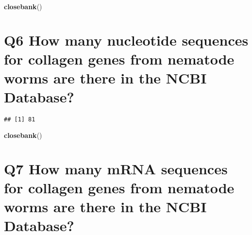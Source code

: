 \documentclass[]{article}
\newenvironment{Shaded}{\begin{snugshade}}{\end{snugshade}}
\newcommand{\KeywordTok}[1]{\textcolor[rgb]{0.13,0.29,0.53}{\textbf{#1}}}
\newcommand{\StringTok}[1]{\textcolor[rgb]{0.31,0.60,0.02}{#1}}
\newcommand{\OperatorTok}[1]{\textcolor[rgb]{0.81,0.36,0.00}{\textbf{#1}}}
\newcommand{\NormalTok}[1]{#1}
\begin{document}
\begin{Shaded}
\begin{Highlighting}[]
\KeywordTok{closebank}\NormalTok{()}
\end{Highlighting}
\end{Shaded}

\section{Q6 How many nucleotide sequences for collagen genes from
nematode worms are there in the NCBI
Database?}\label{q6-how-many-nucleotide-sequences-for-collagen-genes-from-nematode-worms-are-there-in-the-ncbi-database}

\begin{Shaded}
\end{Shaded}

\begin{verbatim}
## [1] 81
\end{verbatim}

\begin{Shaded}
\begin{Highlighting}[]
\KeywordTok{closebank}\NormalTok{()}
\end{Highlighting}
\end{Shaded}

\section{Q7 How many mRNA sequences for collagen genes from nematode
worms are there in the NCBI
Database?}\label{q7-how-many-mrna-sequences-for-collagen-genes-from-nematode-worms-are-there-in-the-ncbi-database}

\begin{Shaded}
\end{Shaded}
\end{document}

